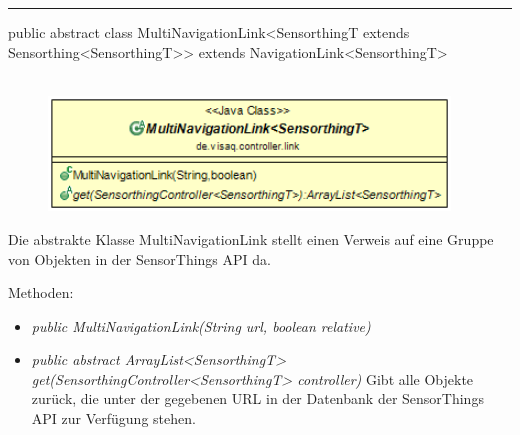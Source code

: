 \rule{\textwidth}{0.4pt}
public abstract class MultiNavigationLink<SensorthingT extends Sensorthing<SensorthingT>> extends NavigationLink<SensorthingT>
\\\\
\begin{minipage}{0.4\textwidth}
    \begin{figure}[H]
        {\centering\includegraphics[width=0.95\textwidth]{media/backend/controller/classes/MultiNavigationLink.png}}
    \end{figure}
    \end{minipage} \hfill
\begin{minipage}{0.6\textwidth}
    Die abstrakte Klasse MultiNavigationLink stellt einen Verweis auf eine Gruppe von Objekten in der \gls{SensorThings API} da.
\end{minipage}

Methoden:
\begin{itemize}
    \item \emph{public MultiNavigationLink(String url, boolean relative)}
    \relativeDescription
    \item \emph{public abstract ArrayList<SensorthingT> get(SensorthingController<SensorthingT> controller)}
    Gibt alle Objekte zurück, die unter der gegebenen URL in der Datenbank der \gls{SensorThings API} zur Verfügung stehen.
\end{itemize}

